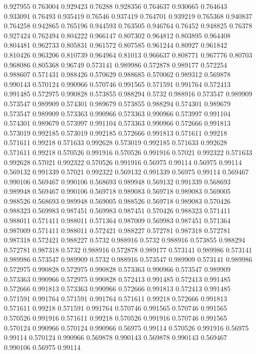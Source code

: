 0.927955 0.763004
0.929423 0.76288
0.928356 0.764637
0.930665 0.764643
0.933091 0.76493
0.935419 0.76546
0.937419 0.764701
0.939219 0.765368
0.940837 0.764258
0.942865 0.765196
0.944593 0.763505
0.946764 0.76452
0.948825 0.76378
0.927424 0.762494
0.804222 0.966147
0.807302 0.964812
0.803895 0.964408
0.804481 0.962733
0.805831 0.961572
0.807585 0.961244
0.80927 0.961842
0.810426 0.963206
0.810739 0.964964
0.81013 0.966637
0.808771 0.967776
0.80703 0.968086
0.805368 0.96749
0.573141 0.989986
0.572878 0.989177
0.572254 0.988607
0.571431 0.988426
0.570629 0.988685
0.570062 0.989312
0.569878 0.990143
0.570124 0.990966
0.570746 0.991565
0.571591 0.991764
0.572413 0.991485
0.572975 0.990828
0.573855 0.988294
0.5732 0.988916
0.573547 0.989909
0.573547 0.989909
0.574301 0.989679
0.573855 0.988294
0.574301 0.989679
0.573547 0.989909
0.573363 0.990966
0.573363 0.990966
0.573997 0.991104
0.574301 0.989679
0.573997 0.991104
0.573363 0.990966
0.572666 0.991813
0.573019 0.992185
0.573019 0.992185
0.572666 0.991813
0.571611 0.99218
0.571611 0.99218
0.571633 0.992628
0.573019 0.992185
0.571633 0.992628
0.571611 0.99218
0.570526 0.991916
0.570526 0.991916
0.57021 0.992322
0.571633 0.992628
0.57021 0.992322
0.570526 0.991916
0.56975 0.99114
0.56975 0.99114
0.569132 0.991339
0.57021 0.992322
0.569132 0.991339
0.56975 0.99114
0.569467 0.990106
0.569467 0.990106
0.568693 0.989948
0.569132 0.991339
0.568693 0.989948
0.569467 0.990106
0.569718 0.989083
0.569718 0.989083
0.569005 0.988526
0.568693 0.989948
0.569005 0.988526
0.569718 0.989083
0.570426 0.988323
0.569983 0.987451
0.569983 0.987451
0.570426 0.988323
0.571411 0.988011
0.571411 0.988011
0.571364 0.987009
0.569983 0.987451
0.571364 0.987009
0.571411 0.988011
0.572421 0.988227
0.572781 0.987318
0.572781 0.987318
0.572421 0.988227
0.5732 0.988916
0.5732 0.988916
0.573855 0.988294
0.572781 0.987318
0.5732 0.988916
0.572878 0.989177
0.573141 0.989986
0.573141 0.989986
0.573547 0.989909
0.5732 0.988916
0.573547 0.989909
0.573141 0.989986
0.572975 0.990828
0.572975 0.990828
0.573363 0.990966
0.573547 0.989909
0.573363 0.990966
0.572975 0.990828
0.572413 0.991485
0.572413 0.991485
0.572666 0.991813
0.573363 0.990966
0.572666 0.991813
0.572413 0.991485
0.571591 0.991764
0.571591 0.991764
0.571611 0.99218
0.572666 0.991813
0.571611 0.99218
0.571591 0.991764
0.570746 0.991565
0.570746 0.991565
0.570526 0.991916
0.571611 0.99218
0.570526 0.991916
0.570746 0.991565
0.570124 0.990966
0.570124 0.990966
0.56975 0.99114
0.570526 0.991916
0.56975 0.99114
0.570124 0.990966
0.569878 0.990143
0.569878 0.990143
0.569467 0.990106
0.56975 0.99114
